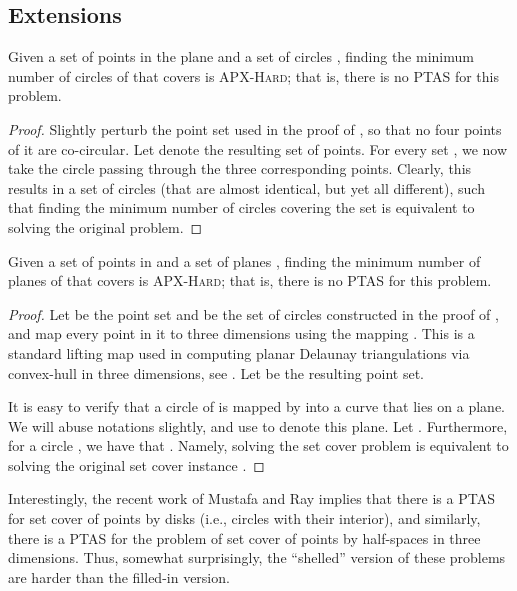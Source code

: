 \documentclass[12pt]{article}
\providecommand{\ComplexityClass}[1]{{{\textcolor[named]{\si{OliveGreen}}{\textsc{#1}}}}}
\providecommand{\APXHard}{{\ComplexityClass{\si{APX}-Hard}}\xspace}
\providecommand{\PTAS}{\textsf{\si{PTAS}}\xspace}
\begin{document}
\subsection{Extensions}

\begin{lemma}
    Given a set of points  in the plane and a set of circles
    , finding the minimum number of circles of  that
    covers  is \APXHard; that is, there is no \PTAS for this
    problem.

\end{lemma}
\begin{proof}
    Slightly perturb the point set used in the proof of ,
    so that no four points of it are co-circular. Let 
    denote the resulting set of points. For every set , we now take the circle passing through the
    three corresponding points. Clearly, this results in a set of
    circles (that are almost identical, but yet all different), such
    that finding the minimum number of circles covering the set
     is equivalent to solving the original problem.
\end{proof}


\begin{lemma}
    Given a set of points  in  and a set of planes
    , finding the minimum number of planes of  that
    covers  is \APXHard; that is, there is no \PTAS for this
    problem.
\end{lemma}
\begin{proof}
    Let  be the point set and  be the set of circles
    constructed in the proof of , and map
    every point in it to three dimensions using the mapping .  This is a standard lifting map used
    in computing planar Delaunay triangulations via convex-hull in
    three dimensions, see \cite{bkos-cgaa-00}.  Let  be the resulting point set.

    It is easy to verify that a circle of  is mapped by
     into a curve that lies on a plane. We will abuse notations
    slightly, and use  to denote this plane.  Let . Furthermore, for a circle , we have
    that .  Namely, solving
    the set cover problem  is equivalent to
    solving the original set cover instance .
\end{proof}

\bigskip

Interestingly, the recent work of Mustafa and Ray \cite{mr-irghsp-09}
implies that there is a \PTAS for set cover of points by disks (i.e.,
circles with their interior), and similarly, there is a \PTAS for the
problem of set cover of points by half-spaces in three
dimensions. Thus, somewhat surprisingly, the ``shelled'' version of
these problems are harder than the filled-in version.
\end{document}

